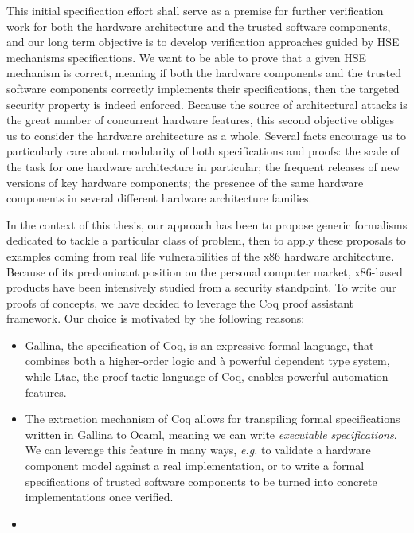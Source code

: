 This initial specification effort shall serve as a premise for further
verification work for both the hardware architecture and the trusted software
components, and our long term objective is to develop verification approaches
guided by HSE mechanisms specifications.
%
We want to be able to prove that a given HSE mechanism is correct, meaning if
both the hardware components and the trusted software components correctly
implements their specifications, then the targeted security property is indeed
enforced.
%
Because the source of architectural attacks is the great number of concurrent
hardware features, this second objective obliges us to consider the hardware
architecture as a whole.
%
Several facts encourage us to particularly care about modularity of both
specifications and proofs:
%
the scale of the task for one hardware architecture in particular;
%
the frequent releases of new versions of key hardware components;
%
the presence of the same hardware components in several different hardware
architecture families.

In the context of this thesis, our approach has been to propose generic
formalisms dedicated to tackle a particular class of problem, then to apply
these proposals to examples coming from real life vulnerabilities of the x86
hardware architecture.
%
Because of its predominant position on the personal computer market, x86-based
products have been intensively studied from a security standpoint.
%
To write our proofs of concepts, we have decided to leverage the Coq proof
assistant framework.
%
Our choice is motivated by the following reasons:
%
\begin{itemize}
\item {\sc Gallina}, the specification of Coq, is an expressive formal language,
  that combines both a higher-order logic and à powerful dependent type system,
  while {\sc Ltac}, the proof tactic language of Coq, enables powerful
  automation features.
\item The extraction mechanism of Coq allows for transpiling formal
  specifications written in {\sc Gallina} to {\sc Ocaml}, meaning we can write
  \emph{executable specifications}. We can leverage this feature in many ways,
  \emph{e.g.} to validate a hardware component model against a real
  implementation, or to write a formal specifications of trusted software
  components to be turned into concrete implementations once verified.
\item {}
\end{itemize}

